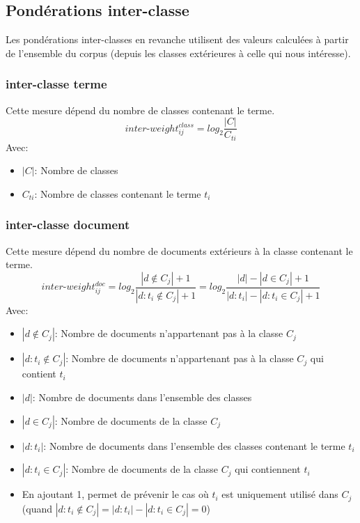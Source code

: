 \documentclass{article}
\begin{document}
\subsection{Pondérations inter-classe}
Les pondérations inter-classes en revanche utilisent des valeurs calculées à partir de l'ensemble du corpus (depuis les classes extérieures à celle qui nous intéresse).
\subsubsection*{inter-classe terme}
Cette mesure dépend du nombre de classes contenant le terme.
\[inter\mbox{-}weight_{ij}^{class} = log_2 \frac{|C|}{C_{ti}}\]
Avec:
\begin{itemize}
	\item $|C|$: Nombre de classes			
	\item $C_{ti}$: Nombre de classes contenant le terme $t_i$
  \end{itemize}
\subsubsection*{inter-classe document}
Cette mesure dépend du nombre de documents extérieurs à la classe contenant le terme.
\[ inter\mbox{-}weight_{ij}^{doc} = log_2 \frac{|d \notin{C_j}|+1}{|d:t_i \notin{C_j}|+1}= log_2 \frac{|d|-|d \in{C_j}|+1}{|d:t_i|-|d:t_i \in{C_j}|+1}\]
 Avec:
\begin{itemize}
	\item $|d \notin  {C_j}|$: Nombre de documents n'appartenant pas à la classe $C_j$
	\item $|d:t_i \notin {C_j}|$: Nombre de documents n'appartenant pas à la classe $C_j$ qui contient $t_i$ 
	\item $|d|$: Nombre de documents dans l'ensemble des classes
	\item $|d \in  {C_j}|$: Nombre de documents de la classe $C_j$
	\item $|d:t_i|$: Nombre de documents dans l'ensemble des classes contenant le terme $t_i$ 
	\item $|d:t_i \in {C_j}|$: Nombre de documents de la classe $C_j$ qui contiennent $t_i$ 
	\item En ajoutant 1, permet de prévenir le cas où $t_i$ est uniquement utilisé dans $C_j$ (quand $|d:t_i \notin{C_j}|={|d:t_i|-|d:t_i \in{C_j}|} = 0$)
  \end{itemize}
\end{document}
